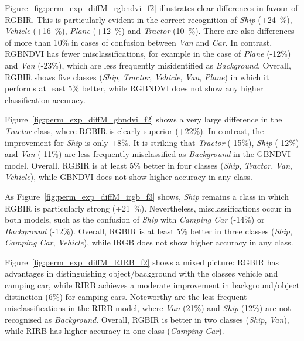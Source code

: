 Figure~\ref{fig:perm_exp_diffM_rgbndvi_f2} illustrates clear differences in favour of RGBIR. This is particularly evident in the correct recognition of \textit{Ship} (+24~\%), \textit{Vehicle} (+16~\%), \textit{Plane} (+12~\%) and \textit{Tractor} (10~\%). There are also differences of more than 10\% in cases of confusion between \textit{Van} and \textit{Car}. In contrast, RGBNDVI has fewer misclassifications, for example in the case of \textit{Plane} (-12\%) and \textit{Van} (-23\%), which are less frequently misidentified as \textit{Background}. Overall, RGBIR shows five classes (\textit{Ship}, \textit{Tractor}, \textit{Vehicle}, \textit{Van}, \textit{Plane}) in which it performs at least 5\% better, while RGBNDVI does not show any higher classification accuracy.


Figure~\ref{fig:perm_exp_diffM_gbndvi_f2} shows a very large difference in the \textit{Tractor} class, where RGBIR is clearly superior (+22\%). In contrast, the improvement for \textit{Ship} is only +8\%. It is striking that \textit{Tractor} (-15\%), \textit{Ship} (-12\%) and \textit{Van} (-11\%) are less frequently misclassified as \textit{Background} in the GBNDVI model. Overall, RGBIR is at least 5\% better in four classes (\textit{Ship}, \textit{Tractor}, \textit{Van}, \textit{Vehicle}), while GBNDVI does not show higher accuracy in any class.




As Figure~\ref{fig:perm_exp_diffM_irgb_f3} shows, \textit{Ship} remains a class in which RGBIR is particularly strong (+21~\%). Nevertheless, misclassifications occur in both models, such as the confusion of \textit{Ship} with \textit{Camping Car} (-14\%) or \textit {Background} (-12\%). Overall, RGBIR is at least 5\% better in three classes (\textit{Ship}, \textit{Camping Car}, \textit{Vehicle}), while IRGB does not show higher accuracy in any class.




Figure~\ref{fig:perm_exp_diffM_RIRB_f2} shows a mixed picture: RGBIR has advantages in distinguishing object/background with the classes vehicle and camping car, while RIRB achieves a moderate improvement in background/object distinction (6\%) for camping cars. Noteworthy are the less frequent misclassifications in the RIRB model, where \textit{Van} (21\%) and \textit{Ship} (12\%) are not recognised as \textit{Background}. Overall, RGBIR is better in two classes (\textit{Ship}, \textit{Van}), while RIRB has higher accuracy in one class (\textit{Camping Car}).




